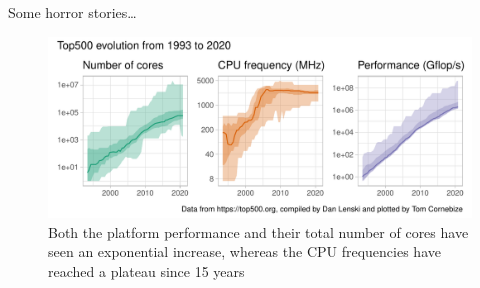 \label{chapter:introduction}

\lipsum[1]

\label{chapter:context}


    Some horror stories\cite{Petrini_2003}\dots
    \begin{figure}[htbp]
        \centering
        \includegraphics[width=\textwidth]{img/context/top500.pdf}
        \caption{\label{fig:context:top500}
        Both the platform performance and their total number of cores have seen an exponential increase, whereas the CPU
        frequencies have reached a plateau since 15 years}
    \end{figure}

\lipsum[1]
